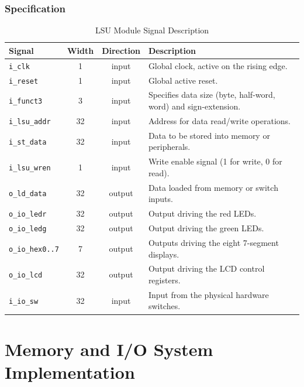 \subsubsection{Specification}
\begin{table}[h]
	\centering
	\begin{tabular}{l c c p{7.5cm}}
		\toprule
		\textbf{Signal} & \textbf{Width} & \textbf{Direction} & \textbf{Description} \\ \midrule
		\texttt{i\_clk} & 1 & input & Global clock, active on the rising edge. \\ 
		\texttt{i\_reset} & 1 & input & Global active reset. \\ 
		\texttt{i\_funct3} & 3 & input & Specifies data size (byte, half-word, word) and sign-extension. \\ 
		\texttt{i\_lsu\_addr} & 32 & input & Address for data read/write operations. \\ 
		\texttt{i\_st\_data} & 32 & input & Data to be stored into memory or peripherals. \\ 
		\texttt{i\_lsu\_wren} & 1 & input & Write enable signal (1 for write, 0 for read). \\ 
		\texttt{o\_ld\_data} & 32 & output & Data loaded from memory or switch inputs. \\ 
		\texttt{o\_io\_ledr} & 32 & output & Output driving the red LEDs. \\ 
		\texttt{o\_io\_ledg} & 32 & output & Output driving the green LEDs. \\ 
		\texttt{o\_io\_hex0..7} & 7 & output & Outputs driving the eight 7-segment displays. \\ 
		\texttt{o\_io\_lcd} & 32 & output & Output driving the LCD control registers. \\ 
		\texttt{i\_io\_sw} & 32 & input & Input from the physical hardware switches. \\ 
		\bottomrule
	\end{tabular}
	\caption{LSU Module Signal Description}
	\label{tab:lsu_spec}
\end{table}
\newpage
\section{Memory and I/O System Implementation}
